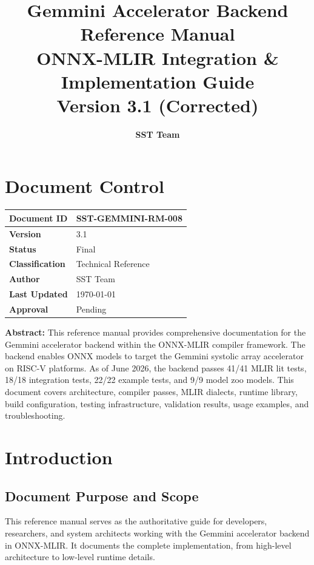 \documentclass[12pt,a4paper]{article}
\title{
    \vspace{2cm}
    {\Huge\bfseries\color{headerblue}Gemmini Accelerator Backend} \\
    {\Large Reference Manual} \\
    \vspace{0.5cm}
    {\large ONNX-MLIR Integration \& Implementation Guide} \\
    \vspace{1cm}
    {\large Version 3.1 (Corrected)}
}
\author{\textbf{SST Team}}
\date{}
\begin{document}
\maketitle
\thispagestyle{empty}
\newpage

\section*{Document Control}

\begin{tabular}{|p{}|p{}|}
\hline
\textbf{Document ID} & SST-GEMMINI-RM-008 \\
\hline
\textbf{Version} & 3.1 \\
\hline
\textbf{Status} & Final \\
\hline
\textbf{Classification} & Technical Reference \\
\hline
\textbf{Author} & SST Team \\
\hline
\textbf{Last Updated} & \today \\
\hline
\textbf{Approval} & Pending \\
\hline
\end{tabular}

\vspace{1cm}

\noindent\textbf{Abstract:} This reference manual provides comprehensive documentation for the Gemmini accelerator backend within the ONNX-MLIR compiler framework. The backend enables ONNX models to target the Gemmini systolic array accelerator on RISC-V platforms. As of June 2026, the backend passes 41/41 MLIR lit tests, 18/18 integration tests, 22/22 example tests, and 9/9 model zoo models. This document covers architecture, compiler passes, MLIR dialects, runtime library, build configuration, testing infrastructure, validation results, usage examples, and troubleshooting.

\newpage

\tableofcontents
\newpage

\section{Introduction}

\subsection{Document Purpose and Scope}

This reference manual serves as the authoritative guide for developers, researchers, and system architects working with the Gemmini accelerator backend in ONNX-MLIR. It documents the complete implementation, from high-level architecture to low-level runtime details.
\end{document}
